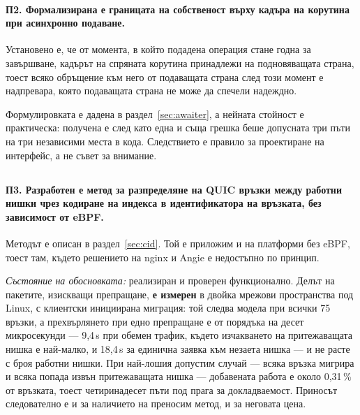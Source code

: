 \paragraph{П2. Формализирана е границата на собственост върху кадъра на корутина при
асинхронно подаване.}
Установено е, че от момента, в който подадена операция стане годна за завършване, кадърът на
спряната корутина принадлежи на подновяващата страна, тоест всяко обръщение към него от
подаващата страна след този момент е надпревара, която подаващата страна не може да спечели
надеждно.

Формулировката е дадена в раздел~\ref{sec:awaiter}, а нейната стойност е практическа:
получена е след като една и съща грешка беше допусната три пъти на три независими места в
кода. Следствието е правило за проектиране на интерфейс, а не съвет за внимание.

\subsection*{}

\paragraph{П3. Разработен е метод за разпределяне на QUIC връзки между работни нишки чрез
кодиране на индекса в идентификатора на връзката, без зависимост от eBPF.}
Методът е описан в раздел~\ref{sec:cid}. Той е приложим и на платформи без eBPF, тоест там,
където решението на nginx и Angie е недостъпно по принцип.

\emph{Състояние на обосновката:} реализиран и проверен функционално. Делът на пакетите,
изискващи препращане, \textbf{е измерен} в двойка мрежови пространства под Linux, с клиентски
инициирана миграция: той следва модела при всички 75 връзки, а прехвърлянето при едно препращане е от порядъка на десет микросекунди — 9,4\,\textmu s при
обемен трафик, където изчакването на притежаващата нишка е най-малко, и 18,4\,\textmu s за
единична заявка към незаета нишка — и не расте с броя работни нишки.
При най-лошия допустим случай — всяка връзка мигрира и всяка попада извън притежаващата нишка —
добавената работа е около 0,31\,\% от връзката, тоест четиринадесет пъти под прага за
докладваемост. Приносът следователно е и за наличието на преносим метод, и за неговата цена.

